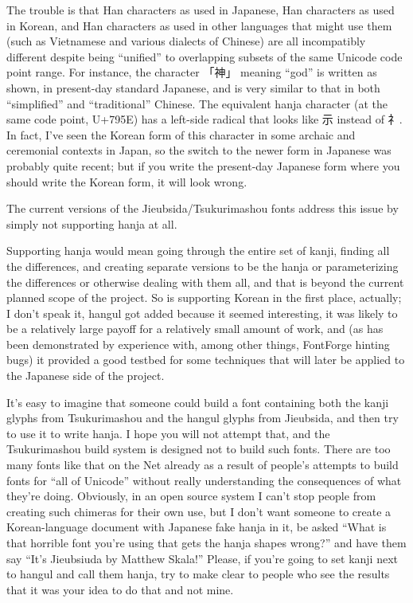 \documentclass[14pt]{extarticle}
\begin{document}
The trouble is that Han characters as used in Japanese, Han characters as
used in Korean, and Han characters as used in other languages that might use
them (such as Vietnamese and various dialects of Chinese) are all
incompatibly different despite being ``unified'' to overlapping subsets of
the same Unicode code point range.  For instance, the character 「神」
meaning ``god'' is written as shown, in present-day standard Japanese, and is
very similar to that in both ``simplified'' and ``traditional'' Chinese.
The equivalent hanja character (at the same code point, U+795E) has a
left-side radical that looks like 示 instead of 礻.  In fact, I've seen the
Korean form of this character in some archaic and ceremonial contexts in
Japan, so the switch to the newer form in Japanese was probably quite
recent; but if you write the present-day Japanese form where you should
write the Korean form, it will look wrong.

The current versions of the Jieubsida/Tsukurimashou fonts address this issue
by simply not supporting hanja at all.

Supporting hanja would mean going through the entire set of kanji, finding
all the differences, and creating separate versions to be the hanja or
parameterizing the differences or otherwise dealing with them all, and that
is beyond the current planned scope of the project.  So is supporting Korean
in the first place, actually; I don't speak it, hangul got added because it
seemed interesting, it was likely to be a relatively large payoff for a
relatively small amount of work, and (as has been demonstrated by experience
with, among other things, FontForge hinting bugs) it provided a good testbed
for some techniques that will later be applied to the Japanese side of the
project.

It's easy to imagine that someone could build a font containing both the
kanji glyphs from Tsukurimashou and the hangul glyphs from Jieubsida, and
then try to use it to write hanja.  I hope you will not attempt that, and
the Tsukurimashou build system is designed not to build such fonts.  There
are too many fonts like that on the Net already as a result of people's
attempts to build fonts for ``all of Unicode'' without really understanding
the consequences of what they're doing.  Obviously, in an open source system
I can't stop people from creating such chimeras for their own use, but I
don't want someone to create a Korean-language document with Japanese fake
hanja in it, be asked ``What is that horrible font you're using that gets
the hanja shapes wrong?'' and have them say ``It's Jieubsiuda by Matthew
Skala!'' Please, if you're going to set kanji next to hangul and call them
hanja, try to make clear to people who see the results that it was your idea
to do that and not mine.
\end{document}
